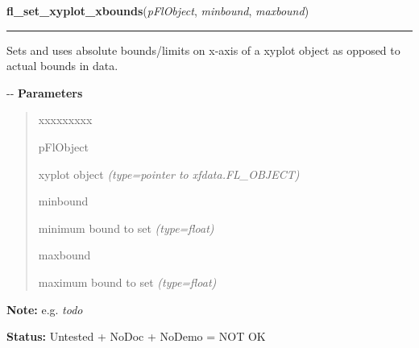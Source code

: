     \label{xformslib:flxyplot:fl_set_xyplot_xbounds}

    \vspace{0.5ex}

\hspace{.8\funcindent}\begin{boxedminipage}{\funcwidth}

    \raggedright \textbf{fl\_set\_xyplot\_xbounds}(\textit{pFlObject}, \textit{minbound}, \textit{maxbound})

    \vspace{-1.5ex}

    \rule{\textwidth}{0.5\fboxrule}
\setlength{\parskip}{2ex}

Sets and uses absolute bounds/limits on x-axis of a xyplot object as
opposed to actual bounds in data.

-{}-
\setlength{\parskip}{1ex}
      \textbf{Parameters}
      \vspace{-1ex}

      \begin{quote}
        \begin{Ventry}{xxxxxxxxx}

          \item[pFlObject]


xyplot object
            {\it (type=pointer to xfdata.FL\_OBJECT)}

          \item[minbound]


minimum bound to set
            {\it (type=float)}

          \item[maxbound]


maximum bound to set
            {\it (type=float)}

        \end{Ventry}

      \end{quote}

\textbf{Note:} 
e.g. \emph{todo}


\textbf{Status:} 
Untested + NoDoc + NoDemo = NOT OK


    \end{boxedminipage}

    \label{xformslib:flxyplot:fl_set_xyplot_ybounds}


